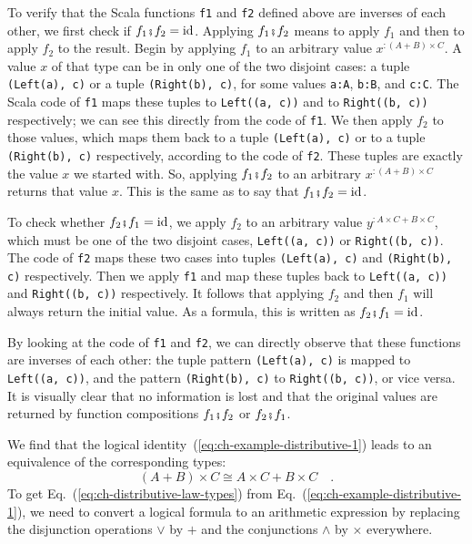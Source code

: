 To verify that the Scala functions \lstinline!f1! and \lstinline!f2!
defined above are inverses of each other, we first check if $f_{1}\bef f_{2}=\text{id}$.
Applying $f_{1}\bef f_{2}$ means to apply $f_{1}$ and then to apply
$f_{2}$ to the result. Begin by applying $f_{1}$ to an arbitrary
value $x^{:(A+B)\times C}$. A value $x$ of that type can be in only
one of the two disjoint cases: a tuple \lstinline!(Left(a), c)! or
a tuple \lstinline!(Right(b), c)!, for some values \lstinline!a:A!,
\lstinline!b:B!, and \lstinline!c:C!. The Scala code of \lstinline!f1!
maps these tuples to \lstinline!Left((a, c))! and to \lstinline!Right((b, c))!
respectively; we can see this directly from the code of \lstinline!f1!.
We then apply $f_{2}$ to those values, which maps them back to a
tuple \lstinline!(Left(a), c)! or to a tuple \lstinline!(Right(b), c)!
respectively, according to the code of \lstinline!f2!. These tuples
are exactly the value $x$ we started with. So, applying $f_{1}\bef f_{2}$
to an arbitrary $x^{:(A+B)\times C}$ returns that value $x$. This
is the same as to say that $f_{1}\bef f_{2}=\text{id}$.

To check whether $f_{2}\bef f_{1}=\text{id}$, we apply $f_{2}$ to
an arbitrary value $y^{:A\times C+B\times C}$, which must be one
of the two disjoint cases, \lstinline!Left((a, c))! or \lstinline!Right((b, c))!.
The code of \lstinline!f2! maps these two cases into tuples \lstinline!(Left(a), c)!
and \lstinline!(Right(b), c)! respectively. Then we apply \lstinline!f1!
and map these tuples back to \lstinline!Left((a, c))! and \lstinline!Right((b, c))!
respectively. It follows that applying $f_{2}$ and then $f_{1}$
will always return the initial value. As a formula, this is written
as $f_{2}\bef f_{1}=\text{id}$.

By looking at the code of \lstinline!f1! and \lstinline!f2!, we
can directly observe that these functions are inverses of each other:
the tuple pattern \lstinline!(Left(a), c)! is mapped to \lstinline!Left((a, c))!,
and the pattern \lstinline!(Right(b), c)! to \lstinline!Right((b, c))!,
or vice versa. It is visually clear that no information is lost and
that the original values are returned by function compositions $f_{1}\bef f_{2}$
or $f_{2}\bef f_{1}$.

We find that the logical identity~(\ref{eq:ch-example-distributive-1})
leads to an equivalence of the corresponding types:
\begin{equation}
\left(A+B\right)\times C\cong A\times C+B\times C\quad.\label{eq:ch-distributive-law-types}
\end{equation}
To get Eq.~(\ref{eq:ch-distributive-law-types}) from Eq.~(\ref{eq:ch-example-distributive-1}),
we need to convert a logical formula to an arithmetic expression by
replacing the disjunction operations $\vee$ by $+$ and the conjunctions
$\wedge$ by $\times$ everywhere.

